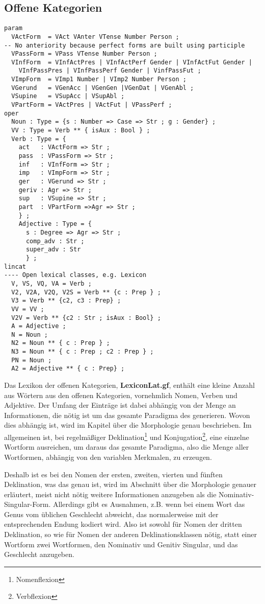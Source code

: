 \subsection{Offene Kategorien}
\label{subsec:offene}
\begin{lstlisting}[float=h!tp,caption={Für \textbf{LexiconLat.gf} nötige \texttt{lincat}-Definitionen für offene Kategorien},label={GF-Lexicon-Lincat},basicstyle=\small]
param 
  VActForm  = VAct VAnter VTense Number Person ;
-- No anteriority because perfect forms are built using participle
  VPassForm = VPass VTense Number Person ; 
  VInfForm  = VInfActPres | VInfActPerf Gender | VInfActFut Gender | 
    VInfPassPres | VInfPassPerf Gender | VinfPassFut ;
  VImpForm  = VImp1 Number | VImp2 Number Person ;
  VGerund   = VGenAcc | VGenGen |VGenDat | VGenAbl ;
  VSupine   = VSupAcc | VSupAbl ;
  VPartForm = VActPres | VActFut | VPassPerf ;
oper
  Noun : Type = {s : Number => Case => Str ; g : Gender} ;
  VV : Type = Verb ** { isAux : Bool } ;
  Verb : Type = {
    act   : VActForm => Str ;
    pass  : VPassForm => Str ;
    inf   : VInfForm => Str ;
    imp   : VImpForm => Str ;
    ger   : VGerund => Str ;
    geriv : Agr => Str ; 
    sup   : VSupine => Str ;
    part  : VPartForm =>Agr => Str ;
    } ;
    Adjective : Type = {
      s : Degree => Agr => Str ;
      comp_adv : Str ; 
      super_adv : Str 
      } ;
lincat
---- Open lexical classes, e.g. Lexicon
  V, VS, VQ, VA = Verb ; 
  V2, V2A, V2Q, V2S = Verb ** {c : Prep } ;
  V3 = Verb ** {c2, c3 : Prep} ;
  VV = VV ;
  V2V = Verb ** {c2 : Str ; isAux : Bool} ;
  A = Adjective ;
  N = Noun ;
  N2 = Noun ** { c : Prep } ;
  N3 = Noun ** { c : Prep ; c2 : Prep } ;
  PN = Noun ;
  A2 = Adjective ** { c : Prep} ;
\end{lstlisting}
Das Lexikon der offenen Kategorien, \textbf{LexiconLat.gf}, enthält eine kleine Anzahl aus Wörtern aus den offenen Kategorien, vornehmlich Nomen, Verben und Adjektive. Der Umfang der Einträge ist dabei abhängig von der Menge an Informationen, die nötig ist um das gesamte Paradigma des generieren. Wovon dies abhängig ist, wird im Kapitel über die Morphologie genau beschrieben. Im allgemeinen ist, bei regelmäßiger Deklination\footnote{Nomenflexion} und Konjugation\footnote{Verbflexion}, eine einzelne Wortform ausreichen, um daraus das gesamte Paradigma, also die Menge aller Wortformen, abhängig von den variablen Merkmalen, zu erzeugen. \par
Deshalb ist es bei den Nomen der ersten, zweiten, vierten und fünften Deklination, was das genau ist, wird im Abschnitt über die Morphologie genauer erläutert, meist nicht nötig weitere Informationen anzugeben als die Nominativ-Singular-Form. Allerdings gibt es Ausnahmen, z.B. wenn bei einem Wort das Genus vom üblichen Geschlecht abweicht, das normalerweise mit der entsprechenden Endung kodiert wird. Also ist sowohl für Nomen der dritten Deklination, so wie für Nomen der anderen Deklinationsklassen nötig, statt einer Wortform zwei Wortformen, den Nominativ und Genitiv Singular, und das Geschlecht anzugeben. \par

